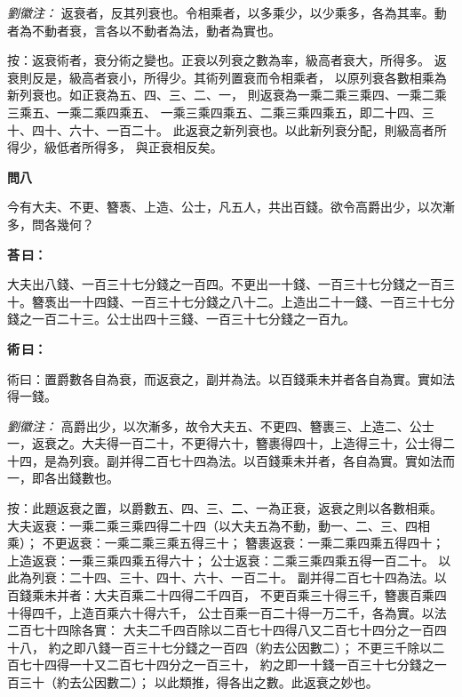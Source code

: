 \documentclass[11pt,a4paper]{article}
\newenvironment{problem}[1][]{%
  \par\vspace{0.6em}\noindent\textcolor{problemcolor}{\textbf{問\ignorespaces#1\unskip}\hspace{0.5em}}%
  \ignorespaces
}{\par\vspace{0.4em}}
\newenvironment{answer}{%
  \par\noindent\textcolor{answercolor}{\textbf{荅\,曰：}}%
  \ignorespaces
}{\par\vspace{0.3em}}
\newenvironment{method}{%
  \par\noindent\textcolor{methodcolor}{\textbf{術\,曰：}}%
  \ignorespaces
}{\par\vspace{0.4em}}
\newenvironment{liuhuicomm}{%
  \par\vspace{0.3em}\noindent\textcolor{commentarycolor}{\small\textit{劉徽注：}}}%
  {\par\vspace{0.5em}}
\begin{document}
\begin{liuhuicomm}
返衰者，反其列衰也。令相乘者，以多乘少，以少乘多，各為其率。動者為不動者衰，言各以不動者為法，動者為實也。

按：返衰術者，衰分術之變也。正衰以列衰之數為率，級高者衰大，所得多。
返衰則反是，級高者衰小，所得少。其術列置衰而令相乘者，
以原列衰各數相乘為新列衰也。如正衰為五、四、三、二、一，
則返衰為一乘二乘三乘四、一乘二乘三乘五、一乘二乘四乘五、
一乘三乘四乘五、二乘三乘四乘五，即二十四、三十、四十、六十、一百二十。
此返衰之新列衰也。以此新列衰分配，則級高者所得少，級低者所得多，
與正衰相反矣。
\end{liuhuicomm}

\begin{problem}[八]
今有大夫、不更、簪褭、上造、公士，凡五人，共出百錢。欲令高爵出少，以次漸多，問各幾何？
\end{problem}

\begin{answer}
大夫出八錢、一百三十七分錢之一百四。不更出一十錢、一百三十七分錢之一百三十。簪褭出一十四錢、一百三十七分錢之八十二。上造出二十一錢、一百三十七分錢之一百二十三。公士出四十三錢、一百三十七分錢之一百九。
\end{answer}

\begin{method}
術曰：置爵數各自為衰，而返衰之，副并為法。以百錢乘未并者各自為實。實如法得一錢。
\end{method}

\begin{liuhuicomm}
高爵出少，以次漸多，故令大夫五、不更四、簪裹三、上造二、公士一，返衰之。大夫得一百二十，不更得六十，簪裹得四十，上造得三十，公士得二十四，是為列衰。副并得二百七十四為法。以百錢乘未并者，各自為實。實如法而一，即各出錢數也。

按：此題返衰之置，以爵數五、四、三、二、一為正衰，返衰之則以各數相乘。
大夫返衰：一乘二乘三乘四得二十四（以大夫五為不動，動一、二、三、四相乘）；
不更返衰：一乘二乘三乘五得三十；
簪裹返衰：一乘二乘四乘五得四十；
上造返衰：一乘三乘四乘五得六十；
公士返衰：二乘三乘四乘五得一百二十。
以此為列衰：二十四、三十、四十、六十、一百二十。
副并得二百七十四為法。以百錢乘未并者：大夫百乘二十四得二千四百，
不更百乘三十得三千，簪裹百乘四十得四千，上造百乘六十得六千，
公士百乘一百二十得一万二千，各為實。以法二百七十四除各實：
大夫二千四百除以二百七十四得八又二百七十四分之一百四十八，
約之即八錢一百三十七分錢之一百四（約去公因數二）；
不更三千除以二百七十四得一十又二百七十四分之一百三十，
約之即一十錢一百三十七分錢之一百三十（約去公因數二）；
以此類推，得各出之數。此返衰之妙也。
\end{liuhuicomm}
\end{document}
